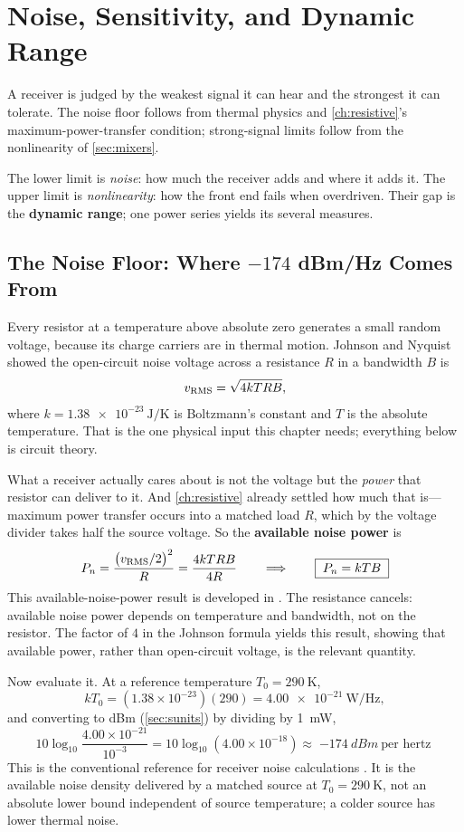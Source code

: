 \chapter{Noise, Sensitivity, and Dynamic Range}
\label{ch:noise}
A receiver is judged by the weakest signal it can hear and the strongest it can
tolerate. The noise floor follows from thermal physics and \cref{ch:resistive}'s
maximum-power-transfer condition; strong-signal limits follow from the nonlinearity
of \cref{sec:mixers}.

The lower limit is \emph{noise}: how much the receiver adds and where it adds it.
The upper limit is \emph{nonlinearity}: how the front end fails when overdriven.
Their gap is the \textbf{dynamic range}; one power series yields its several measures.

\section{The Noise Floor: Where \texorpdfstring{\(-174\)}{-174} dBm/Hz Comes From}
\label{sec:noisefloor}
Every resistor at a temperature above absolute zero generates a small random voltage,
because its charge carriers are in thermal motion. Johnson and Nyquist showed the
open-circuit noise voltage across a resistance \(R\) in a bandwidth \(B\) is
\[
v_{\mathrm{RMS}}=\sqrt{4kTRB},
\]
where \(k=\SI{1.38e-23}{\joule\per\kelvin}\) is Boltzmann's constant and \(T\) is the
absolute temperature. That is the one physical input this chapter needs; everything
below is circuit theory.

What a receiver actually cares about is not the voltage but the \emph{power} that
resistor can deliver to it. And \cref{ch:resistive} already settled how much that
is---maximum power transfer occurs into a matched load \(R\), which by the voltage
divider takes half the source voltage. So the \textbf{available noise power} is
\[
P_n=\frac{\bigl(v_{\mathrm{RMS}}/2\bigr)^2}{R}
=\frac{4kTRB}{4R}
\qquad\Longrightarrow\qquad
\boxed{\;P_n=kTB\;}
\]
This available-noise-power result is developed in
\cite[pp.~257--260]{weber2001microwave}.
The resistance cancels: available noise power depends on temperature and bandwidth,
not on the resistor. The factor of \(4\) in the Johnson formula yields this result,
showing that available power, rather than open-circuit voltage, is the relevant
quantity.

Now evaluate it. At a reference temperature \(T_0=\SI{290}{\kelvin}\),
\[
kT_0=(1.38\times10^{-23})(290)=\SI{4.00e-21}{\watt\per\hertz},
\]
and converting to dBm (\cref{sec:sunits}) by dividing by \SI{1}{\milli\watt},
\[
10\log_{10}\frac{4.00\times10^{-21}}{10^{-3}}
=10\log_{10}(4.00\times10^{-18})
\approx\boxed{\;\SI{-174}{dBm}\ \text{per hertz}\;}
\]
This is the conventional reference for receiver noise calculations
\cite[p.~48]{egan2003practical}. It is the available noise density delivered by a
matched source at \(T_0=\SI{290}{\kelvin}\), not an absolute lower bound independent
of source temperature; a colder source has lower thermal noise.

